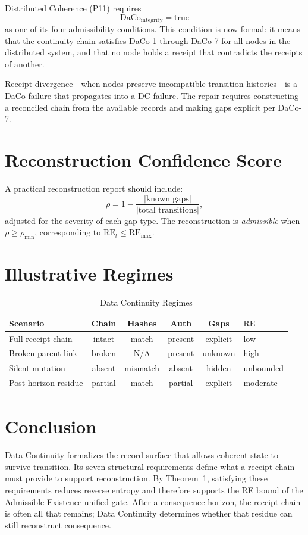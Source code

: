 \documentclass[letterpaper,10pt,conference]{ieeeconf}
\newcommand{\RE}{\mathrm{RE}}
\begin{document}
Distributed Coherence (P11) requires
\[
\text{DaCo}_{\text{integrity}} = \text{true}
\]
as one of its four admissibility conditions. This condition is now formal: it means that the continuity chain satisfies DaCo-1 through DaCo-7 for all nodes in the distributed system, and that no node holds a receipt that contradicts the receipts of another.

Receipt divergence---when nodes preserve incompatible transition histories---is a DaCo failure that propagates into a DC failure. The repair requires constructing a reconciled chain from the available records and making gaps explicit per DaCo-7.

\section{Reconstruction Confidence Score}

A practical reconstruction report should include:
\[
\rho = 1 - \frac{|\text{known gaps}|}{|\text{total transitions}|},
\]
adjusted for the severity of each gap type. The reconstruction is \emph{admissible} when $\rho \ge \rho_{\min}$, corresponding to $\RE_t \le \RE_{\max}$.

\section{Illustrative Regimes}

\begin{table}[h]
\centering
\caption{Data Continuity Regimes}
\begin{tabular}{lccccl}
\hline
Scenario & Chain & Hashes & Auth & Gaps & $\RE$ \\
\hline
Full receipt chain & intact & match & present & explicit & low \\
Broken parent link & broken & N/A & present & unknown & high \\
Silent mutation & absent & mismatch & absent & hidden & unbounded \\
Post-horizon residue & partial & match & partial & explicit & moderate \\
\hline
\end{tabular}
\end{table}

\section{Conclusion}

Data Continuity formalizes the record surface that allows coherent state to survive transition. Its seven structural requirements define what a receipt chain must provide to support reconstruction. By Theorem~1, satisfying these requirements reduces reverse entropy and therefore supports the RE bound of the Admissible Existence unified gate. After a consequence horizon, the receipt chain is often all that remains; Data Continuity determines whether that residue can still reconstruct consequence.
\end{document}
